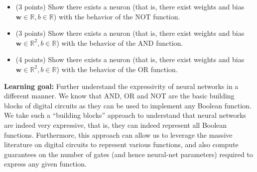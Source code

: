 \begin{itemize}[(a)]
\item (3 points) Show there exists a neuron (that is, there exist weights and bias $\mathbf{w} \in \mathbb{R}, b \in \mathbb{R}$) with the behavior of the NOT function.
\end{itemize}

\begin{itemize}[(b)]
\item (3 points) Show there exists a neuron (that is, there exist weights and bias $\mathbf{w} \in \mathbb{R}^2, b \in \mathbb{R}$)  with the behavior of the AND function.
\end{itemize}

\begin{itemize}[(c)]
\item (4 points) Show there exists a neuron (that is, there exist weights and bias $\mathbf{w} \in \mathbb{R}^2, b \in \mathbb{R}$)  with the behavior of the OR function.
\end{itemize}

{\bf Learning goal:} Further understand the expressivity of neural networks in a different manner. We know that AND, OR and NOT are the basic building blocks of digital circuits as they can be used to implement any Boolean function. We take such a ``building blocks'' approach to understand that neural networks are indeed very expressive, that is, they can indeed represent all Boolean functions. Furthermore, this approach can allow us to leverage the massive literature on digital circuits to represent various functions, and also compute guarantees on the number of gates (and hence neural-net parameters) required to express any given function. 